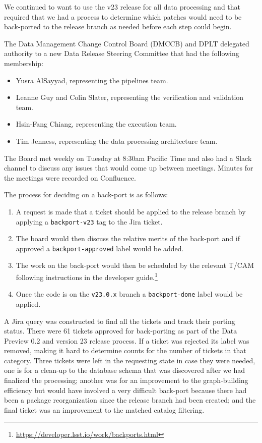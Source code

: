 We continued to want to use the v23 release for all data processing and that required that we had a process to determine which patches would need to be back-ported to the release branch as needed before each step could begin.

The Data Management Change Control Board (DMCCB) and DPLT delegated authority to a new Data Release Steering Committee that had the following membership:

\begin{itemize}
\item Yusra AlSayyad, representing the pipelines team.
\item Leanne Guy and Colin Slater, representing the verification and validation team.
\item Hsin-Fang Chiang, representing the execution team.
\item Tim Jenness, representing the data processing architecture team.
\end{itemize}

The Board met weekly on Tuesday at 8:30am Pacific Time and also had a Slack channel to discuss any issues that would come up between meetings.
Minutes for the meetings were recorded on Confluence.

The process for deciding on a back-port is as follows:

\begin{enumerate}

\item A request is made that a ticket should be applied to the release branch by applying a \texttt{backport-v23} tag to the Jira ticket.
\item The board would then discuss the relative merits of the back-port and if approved a \texttt{backport-approved} label would be added.
\item The work on the back-port would then be scheduled by the relevant T/CAM following instructions in the developer guide.\footnote{\url{https://developer.lsst.io/work/backports.html}}
\item Once the code is on the \texttt{v23.0.x} branch a \texttt{backport-done} label would be applied.

\end{enumerate}

A Jira query was constructed to find all the tickets and track their porting status.
There were 61 tickets approved for back-porting as part of the Data Preview 0.2 and version 23 release process.
If a ticket was rejected its label was removed, making it hard to determine counts for the number of tickets in that category.
Three tickets were left in the requesting state in case they were needed, one is for a clean-up to the database schema that was discovered after we had finalized the processing; another was for an improvement to the graph-building efficiency but would have involved a very difficult back-port because there had been a package reorganization since the release branch had been created; and the final ticket was an improvement to the matched catalog filtering.

